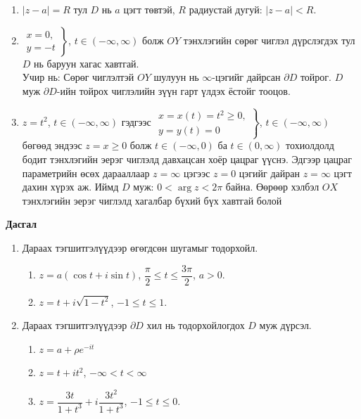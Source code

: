 \begin{sol}
\begin{enumerate}
    \item $|z-a|=R$ тул $D$ нь $a$ цэгт төвтэй, $R$ радиустай дугуй: $|z-a|<R.$
    \item $\left.\begin{array}{c}
x=0, \\
y=-t
\end{array}\right\}$, $t\in (-\infty, \infty)$ болж $OY$ тэнхлэгийн сөрөг чиглэл дүрслэгдэх тул $D$ нь баруун хагас хавтгай.\\
Учир нь: Сөрөг чиглэлтэй $OY$ шулуун нь $\infty$-цэгийг дайрсан $\partial D$ тойрог. $D$ муж $\partial D$-ийн тойрох чиглэлийн зүүн гарт үлдэх ёстойг тооцов. 
\item $z=t^2$, $t\in (-\infty, \infty)$ гэдгээс 
$\left.\begin{array}{c}
x=x(t)=t^2\geq 0, \\
y= y(t)=0
\end{array}\right\}$, $t\in (-\infty, \infty)$ бөгөөд эндээс $z=x\geq 0$ болж $t\in (-\infty, 0)$ ба $t\in (0,\infty)$ тохиолдолд бодит тэнхлэгийн эерэг чиглэлд давхацсан хоёр цацраг үүснэ. Эдгээр цацраг параметрийн өсөх дарааллаар $z=\infty$ цэгээс $z=0$ цэгийг дайран $z=\infty$ цэгт дахин хүрэх аж. Иймд $D$ муж: $0<\arg  z<2\pi $ байна. Өөрөөр хэлбэл $OX$ тэнхлэгийн эерэг чиглэлд хагалбар бүхий бүх хавтгай болой
\end{enumerate}
\end{sol}
\begin{center}
   \textbf{ Дасгал}
\end{center}
\begin{enumerate}
    \item [10.]Дараах тэгшитгэлүүдээр өгөгдсөн шугамыг тодорхойл.
    \begin{enumerate}
        \item [a)] $z=a(\cos t+i\sin t)$, \quad $\dfrac{\pi}{2}\leq t\leq \dfrac{3\pi}{2}$, $a>0.$
        \item [б)] $z=t+i\sqrt{ 1-t^2}$, \quad $-1\leq t\leq 1.$
    \end{enumerate}
    \item [11. ] Дараах тэгшитгэлүүдээр $\partial D$ хил нь тодорхойлогдох $D$ муж дүрсэл.
    \begin{enumerate}
        \item [а)] $z=a+\rho e^{-it}$
        \item [b)] $z=t+it^2$, \quad $-\infty<t<\infty$
        \item [c)] $z=\dfrac{3t}{1+t^3}+i\dfrac{3t^2}{1+t^3}$, \quad $-1\leq t\leq 0.$
    \end{enumerate}
\end{enumerate}